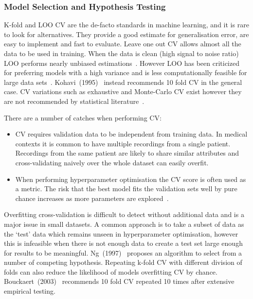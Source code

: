 \documentclass[12pt, twoside]{book}
\begin{document}
\subsubsection{Model Selection and Hypothesis Testing}
\label{msht}
K-fold and LOO CV are the de-facto standards in machine learning, and it is rare to look for alternatives. They provide a good estimate for generalisation error, are easy to implement and fast to evaluate. Leave one out CV allows almost all the data to be used in training. When the data is clean (high signal to noise ratio) LOO performs nearly unbiased estimations~\cite{crossvalsurvey}. However LOO has been criticized for preferring models with a high variance and is less computationally feasible for large data sets~\cite{kohavi1995study}. Kohavi~(1995)~\cite{kohavi1995study} instead recommends 10 fold CV in the general case. CV variations such as exhaustive and Monte-Carlo CV exist however they are not recommended by statistical literature~\cite{kfoldvsloo, crossvalsurvey}. 

There are a number of catches when performing CV:
\begin{itemize}
	\item CV requires validation data to be independent from training data. In medical contexts it is common to have multiple recordings from a single patient. Recordings from the same patient are likely to share similar attributes and cross-validating naively over the whole dataset can easily overfit.
	\item When performing hyperparameter optimisation the CV score is often used as a metric. The risk that the best model fits the validation sets well by pure chance increases as more parameters are explored~\cite{overfittingcv}.
\end{itemize}

Overfitting cross-validation is difficult to detect without additional data and is a major issue in small datasets. A common approach is to take a subset of data as the `test' data which remains unseen in hyperparameter optimisation, however this is infeasible when there is not enough data to create a test set large enough for results to be meaningful. Ng~(1997)~\cite{overfittingcv} proposes an algorithm to select from a number of competing hypothesis. Repeating k-fold CV with different division of folds can also reduce the likelihood of models overfitting CV by chance. Bouckaert~(2003)~\cite{bestcvempirical} recommends 10 fold CV repeated 10 times after extensive empirical testing.
\end{document}
